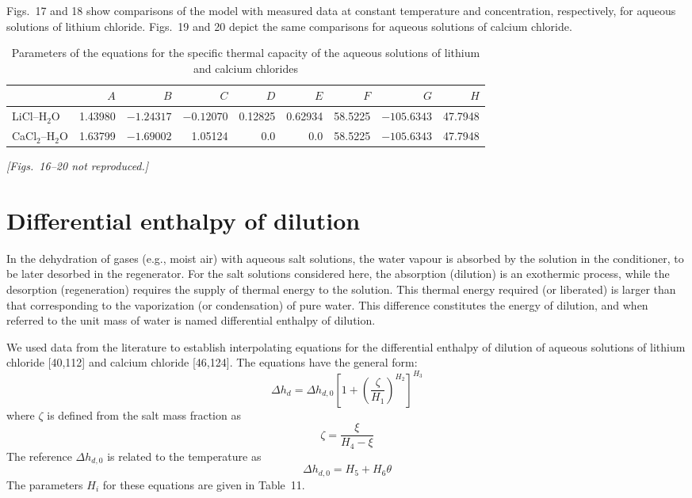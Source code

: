 \documentclass[11pt]{article}
\begin{document}
Figs.~17 and 18 show comparisons of the model with measured data at constant temperature
and concentration, respectively, for aqueous solutions of lithium chloride. Figs.~19 and 20
depict the same comparisons for aqueous solutions of calcium chloride.

\begin{table}[htbp]
\centering
\caption{Parameters of the equations for the specific thermal capacity of the aqueous
solutions of lithium and calcium chlorides}
\begin{tabular}{lrrrrrrrr}
\toprule
 & $A$ & $B$ & $C$ & $D$ & $E$ & $F$ & $G$ & $H$ \\
\midrule
LiCl--H$_2$O & 1.43980 & $-1.24317$ & $-0.12070$ & 0.12825 & 0.62934 & 58.5225 &
$-105.6343$ & 47.7948 \\
CaCl$_2$--H$_2$O & 1.63799 & $-1.69002$ & 1.05124 & 0.0 & 0.0 & 58.5225 & $-105.6343$ &
47.7948 \\
\bottomrule
\end{tabular}
\end{table}

\textit{[Figs.~16--20 not reproduced.]}

\section{Differential enthalpy of dilution}

In the dehydration of gases (e.g., moist air) with aqueous salt solutions, the water
vapour is absorbed by the solution in the conditioner, to be later desorbed in the
regenerator. For the salt solutions considered here, the absorption (dilution) is an
exothermic process, while the desorption (regeneration) requires the supply of thermal
energy to the solution. This thermal energy required (or liberated) is larger than that
corresponding to the vaporization (or condensation) of pure water. This difference
constitutes the energy of dilution, and when referred to the unit mass of water is named
differential enthalpy of dilution.

We used data from the literature to establish interpolating equations for the differential
enthalpy of dilution of aqueous solutions of lithium chloride [40,112] and calcium chloride
[46,124]. The equations have the general form:
\begin{equation}
\Delta h_d = \Delta h_{d,0} \left[1 + \left(\frac{\zeta}{H_1}\right)^{H_2}\right]^{H_3}
\end{equation}
where $\zeta$ is defined from the salt mass fraction as
\begin{equation}
\zeta = \frac{\xi}{H_4 - \xi}
\end{equation}
The reference $\Delta h_{d,0}$ is related to the temperature as
\begin{equation}
\Delta h_{d,0} = H_5 + H_6 \theta
\end{equation}
The parameters $H_i$ for these equations are given in Table~11.
\end{document}
